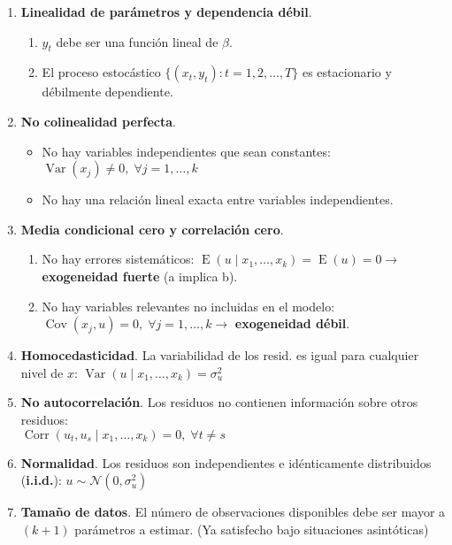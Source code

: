 \documentclass[10pt, a4paper, landscape]{article}
\DeclareMathOperator{\E}{E}
\DeclareMathOperator{\Var}{Var}
\DeclareMathOperator{\Cov}{Cov}
\DeclareMathOperator{\Corr}{Corr}
\begin{document}
\begin{multicols}{3}
\begin{enumerate}[leftmargin=*, label=t\arabic{*}.]
	\item \textbf{Linealidad de parámetros y dependencia débil}.
	\begin{enumerate}[leftmargin=*, label=\alph{*}.]
		\item \( y_{t} \) debe ser una función lineal de \( \beta \).
		\item El proceso estocástico \( \lbrace (x_{t}, y_{t}) : t = 1, 2, \ldots, T \rbrace \) es estacionario y débilmente dependiente.
	\end{enumerate}
	\item \textbf{No colinealidad perfecta}.
	\begin{itemize}[leftmargin=*]
		\item No hay variables independientes que sean constantes: \( \Var(x_{j}) \neq 0, \; \forall j = 1, \ldots, k \)
		\item No hay una relación lineal exacta entre variables independientes.
	\end{itemize}
	\item \textbf{Media condicional cero y correlación cero}.
	\begin{enumerate}[leftmargin=*, label=\alph{*}.]
		\item No hay errores sistemáticos: \( \E(u \mid x_{1}, \ldots, x_{k}) = \E(u) = 0 \rightarrow \) \textbf{exogeneidad fuerte} (a implica b).
		\item No hay variables relevantes no incluidas en el modelo: \( \Cov(x_{j} , u) = 0, \; \forall j = 1, \ldots, k \rightarrow \) \textbf{exogeneidad débil}.
	\end{enumerate}
	\item \textbf{Homocedasticidad}. La variabilidad de los resid. es igual para cualquier nivel de \( x \): \( \Var(u \mid x_{1}, \ldots, x_{k}) = \sigma_{u}^{2} \)
	\item \textbf{No autocorrelación}. Los residuos no contienen información sobre otros residuos: \\
	\( \Corr(u_{t}, u_{s} \mid x_{1}, \ldots, x_{k}) = 0, \; \forall t \neq s \)
	\item \textbf{Normalidad}. Los residuos son independientes e idénticamente distribuidos (\textbf{i.i.d.}): \( u \sim \mathcal{N} (0, \sigma_{u}^{2}) \)
	\item \textbf{Tamaño de datos}. El número de observaciones disponibles debe ser mayor a \( (k + 1) \) parámetros a estimar. (Ya satisfecho bajo situaciones asintóticas)
\end{enumerate}


\end{multicols}
\end{document}
